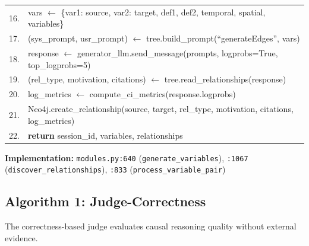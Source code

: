 \begin{table}[H]
\begin{tabular}{@{}r l@{}}
16. & \quad vars $\leftarrow$ \{var1: source, var2: target, def1, def2, temporal, spatial, variables\} \\
17. & \quad (sys\_prompt, usr\_prompt) $\leftarrow$ tree.build\_prompt(``generateEdges'', vars) \\
18. & \quad response $\leftarrow$ generator\_llm.send\_message(prompts, logprobs=True, top\_logprobs=5) \\
19. & \quad (rel\_type, motivation, citations) $\leftarrow$ tree.read\_relationships(response) \\
20. & \quad log\_metrics $\leftarrow$ compute\_ci\_metrics(response.logprobs) \\
21. & \quad Neo4j.create\_relationship(source, target, rel\_type, motivation, citations, log\_metrics) \\
22. & \textbf{return} session\_id, variables, relationships \\
\bottomrule
\end{tabular}
\end{table}

\textbf{Implementation:} \texttt{modules.py:640} (\texttt{generate\_variables}), \texttt{:1067} (\texttt{discover\_relationships}), \texttt{:833} (\texttt{process\_variable\_pair})

\subsection{Algorithm 1: Judge-Correctness}
\label{alg:judge_correctness}

The correctness-based judge evaluates causal reasoning quality without external evidence.

